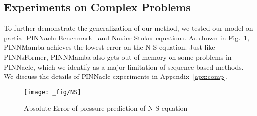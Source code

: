 \vspace{-3mm}
\subsection{Experiments on Complex Problems}
\vspace{-1mm}
To further demonstrate the generalization of our method, we tested our model on partial PINNacle Benchmark~\cite{hao2023pinnacle} and Navier-Stokes equations. As shown in Fig.~\ref{fig:ns}, PINNMamba achieves the lowest error on the N-S equation. Just like PINNsFormer, PINNMamba also gets out-of-memory on some problems in PINNacle, which we identify as a major limitation of sequence-based methods. We discuss the details of PINNacle experiments in Appendix~\ref{apx:comp}.

\begin{figure}[t!]
    \centering
    \texttt{[image: \_fig/NS]}
    \vspace{-6mm}
    \caption{Absolute Error of pressure prediction of N-S equation}
    \label{fig:ns}
    \vspace{-3mm}
\end{figure}
